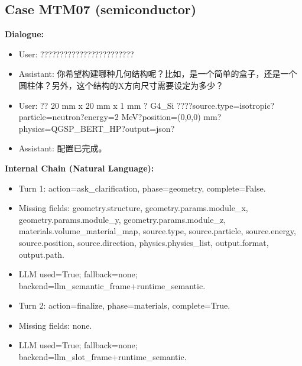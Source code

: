 \documentclass[11pt]{ctexart}
\begin{document}
\subsection{Case MTM07 (semiconductor)}
\textbf{Dialogue:}
\begin{itemize}
\item User: ????????????????????????
\item Assistant: 你希望构建哪种几何结构呢？比如，是一个简单的盒子，还是一个圆柱体？另外，这个结构的X方向尺寸需要设定为多少？
\item User: ?? 20 mm x 20 mm x 1 mm ? G4\_Si ????source.type=isotropic?particle=neutron?energy=2 MeV?position=(0,0,0) mm?physics=QGSP\_BERT\_HP?output=json?
\item Assistant: 配置已完成。
\end{itemize}
\textbf{Internal Chain (Natural Language):}
\begin{itemize}
\item Turn 1: action=ask\_clarification, phase=geometry, complete=False.
\item Missing fields: geometry.structure, geometry.params.module\_x, geometry.params.module\_y, geometry.params.module\_z, materials.volume\_material\_map, source.type, source.particle, source.energy, source.position, source.direction, physics.physics\_list, output.format, output.path.
\item LLM used=True; fallback=none; backend=llm\_semantic\_frame+runtime\_semantic.
\item Turn 2: action=finalize, phase=materials, complete=True.
\item Missing fields: none.
\item LLM used=True; fallback=none; backend=llm\_slot\_frame+runtime\_semantic.
\end{itemize}
\end{document}
